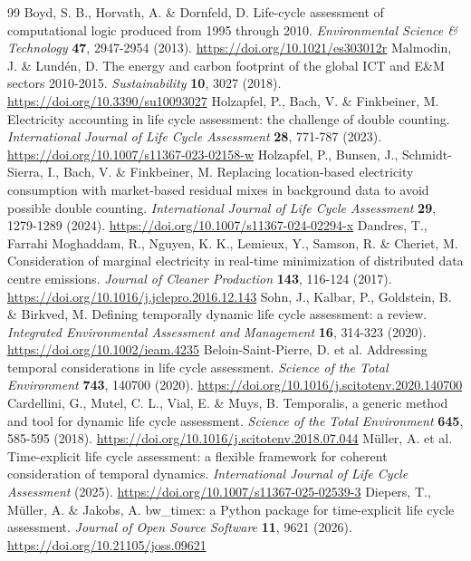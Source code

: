 \documentclass[review,12pt]{elsarticle}
\begin{document}
\begin{thebibliography}{99}
 Boyd, S. B., Horvath, A. \& Dornfeld, D. Life-cycle assessment of computational logic produced from 1995 through 2010. \textit{Environmental Science \& Technology} \textbf{47}, 2947-2954 (2013). \url{https://doi.org/10.1021/es303012r}
 Malmodin, J. \& Lundén, D. The energy and carbon footprint of the global ICT and E\&M sectors 2010-2015. \textit{Sustainability} \textbf{10}, 3027 (2018). \url{https://doi.org/10.3390/su10093027}
 Holzapfel, P., Bach, V. \& Finkbeiner, M. Electricity accounting in life cycle assessment: the challenge of double counting. \textit{International Journal of Life Cycle Assessment} \textbf{28}, 771-787 (2023). \url{https://doi.org/10.1007/s11367-023-02158-w}
 Holzapfel, P., Bunsen, J., Schmidt-Sierra, I., Bach, V. \& Finkbeiner, M. Replacing location-based electricity consumption with market-based residual mixes in background data to avoid possible double counting. \textit{International Journal of Life Cycle Assessment} \textbf{29}, 1279-1289 (2024). \url{https://doi.org/10.1007/s11367-024-02294-x}
 Dandres, T., Farrahi Moghaddam, R., Nguyen, K. K., Lemieux, Y., Samson, R. \& Cheriet, M. Consideration of marginal electricity in real-time minimization of distributed data centre emissions. \textit{Journal of Cleaner Production} \textbf{143}, 116-124 (2017). \url{https://doi.org/10.1016/j.jclepro.2016.12.143}
 Sohn, J., Kalbar, P., Goldstein, B. \& Birkved, M. Defining temporally dynamic life cycle assessment: a review. \textit{Integrated Environmental Assessment and Management} \textbf{16}, 314-323 (2020). \url{https://doi.org/10.1002/ieam.4235}
 Beloin-Saint-Pierre, D. et al. Addressing temporal considerations in life cycle assessment. \textit{Science of the Total Environment} \textbf{743}, 140700 (2020). \url{https://doi.org/10.1016/j.scitotenv.2020.140700}
 Cardellini, G., Mutel, C. L., Vial, E. \& Muys, B. Temporalis, a generic method and tool for dynamic life cycle assessment. \textit{Science of the Total Environment} \textbf{645}, 585-595 (2018). \url{https://doi.org/10.1016/j.scitotenv.2018.07.044}
 Müller, A. et al. Time-explicit life cycle assessment: a flexible framework for coherent consideration of temporal dynamics. \textit{International Journal of Life Cycle Assessment} (2025). \url{https://doi.org/10.1007/s11367-025-02539-3}
 Diepers, T., Müller, A. \& Jakobs, A. bw\_timex: a Python package for time-explicit life cycle assessment. \textit{Journal of Open Source Software} \textbf{11}, 9621 (2026). \url{https://doi.org/10.21105/joss.09621}

\end{thebibliography}
\end{document}

